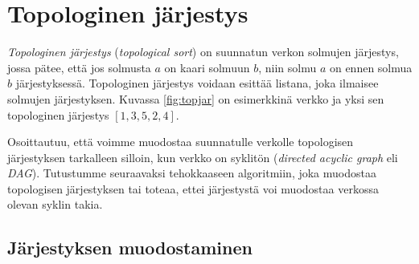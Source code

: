 \section{Topologinen järjestys}


\emph{Topologinen järjestys} (\emph{topological sort})
on suunnatun verkon solmujen järjes\-tys,
jossa pätee, että jos solmusta $a$ on kaari solmuun $b$,
niin solmu $a$ on ennen solmua $b$ järjestyksessä.
Topologinen järjestys voidaan esittää listana,
joka ilmaisee solmujen järjestyksen.
Kuvassa \ref{fig:topjar} on esimerkkinä verkko ja yksi sen topologinen
järjestys $[1,3,5,2,4]$.

Osoittautuu, että voimme muodostaa suunnatulle verkolle
topologisen järjestyksen tarkalleen silloin,
kun verkko on syklitön (\emph{directed acyclic graph} eli \emph{DAG}).
Tutustumme seuraavaksi tehokkaaseen algoritmiin,
joka muodostaa topologisen järjestyksen
tai toteaa, ettei järjestystä voi muodostaa
verkossa olevan syklin takia.

\subsection{Järjestyksen muodostaminen}

